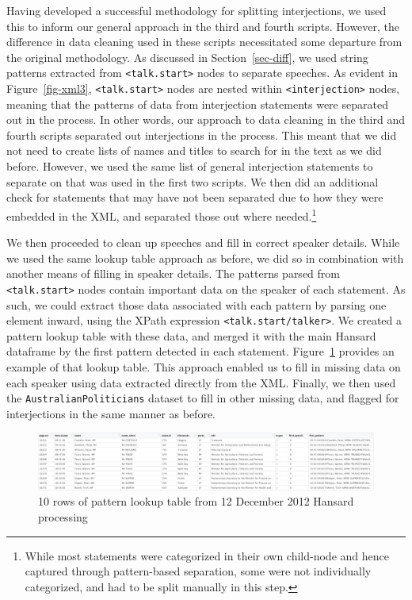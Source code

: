 \documentclass[
  letterpaper,
  DIV=11,
  numbers=noendperiod]{scrartcl}
\begin{document}
Having developed a successful methodology for splitting interjections,
we used this to inform our general approach in the third and fourth
scripts. However, the difference in data cleaning used in these scripts
necessitated some departure from the original methodology. As discussed
in Section~\ref{sec-diff}, we used string patterns extracted from
\texttt{\textless{}talk.start\textgreater{}} nodes to separate speeches.
As evident in Figure~\ref{fig-xml3},
\texttt{\textless{}talk.start\textgreater{}} nodes are nested within
\texttt{\textless{}interjection\textgreater{}} nodes, meaning that the
patterns of data from interjection statements were separated out in the
process. In other words, our approach to data cleaning in the third and
fourth scripts separated out interjections in the process. This meant
that we did not need to create lists of names and titles to search for
in the text as we did before. However, we used the same list of general
interjection statements to separate on that was used in the first two
scripts. We then did an additional check for statements that may have
not been separated due to how they were embedded in the XML, and
separated those out where needed.\footnote{While most statements were
  categorized in their own child-node and hence captured through
  pattern-based separation, some were not individually categorized, and
  had to be split manually in this step.}

We then proceeded to clean up speeches and fill in correct speaker
details. While we used the same lookup table approach as before, we did
so in combination with another means of filling in speaker details. The
patterns parsed from \texttt{\textless{}talk.start\textgreater{}} nodes
contain important data on the speaker of each statement. As such, we
could extract those data associated with each pattern by parsing one
element inward, using the XPath expression
\texttt{\textless{}talk.start/talker\textgreater{}}. We created a
pattern lookup table with these data, and merged it with the main
Hansard dataframe by the first pattern detected in each statement.
Figure~\ref{fig-patterns} provides an example of that lookup table. This
approach enabled us to fill in missing data on each speaker using data
extracted directly from the XML. Finally, we then used the
\texttt{AustralianPoliticians} dataset to fill in other missing data,
and flagged for interjections in the same manner as before.

\begin{figure}

{\centering \includegraphics{pattern_lookup.png}

}

\caption{\label{fig-patterns}10 rows of pattern lookup table from 12
December 2012 Hansard processing}

\end{figure}
\end{document}
